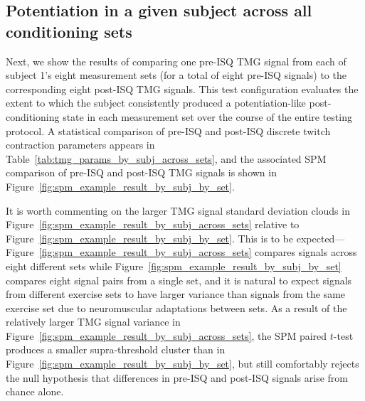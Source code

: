 \documentclass[utf8]{FrontiersinHarvard}
\begin{document}
\subsection{Potentiation in a given subject across all conditioning sets}
Next, we show the results of comparing one pre-ISQ TMG signal from each of subject 1's eight measurement sets (for a total of eight pre-ISQ signals) to the corresponding eight post-ISQ TMG signals.
This test configuration evaluates the extent to which the subject consistently produced a potentiation-like post-conditioning state in each measurement set over the course of the entire testing protocol.
A statistical comparison of pre-ISQ and post-ISQ discrete twitch contraction parameters appears in Table~\ref{tab:tmg_params_by_subj_across_sets},
and the associated SPM comparison of pre-ISQ and post-ISQ TMG signals is shown in Figure~\ref{fig:spm_example_result_by_subj_by_set}.

It is worth commenting on the larger TMG signal standard deviation clouds in Figure~\ref{fig:spm_example_result_by_subj_across_sets} relative to Figure~\ref{fig:spm_example_result_by_subj_by_set}.
This is to be expected---Figure~\ref{fig:spm_example_result_by_subj_across_sets} compares signals across eight different sets while Figure~\ref{fig:spm_example_result_by_subj_by_set} compares eight signal pairs from a single set, and it is natural to expect signals from different exercise sets to have larger variance than signals from the same exercise set due to neuromuscular adaptations between sets.
As a result of the relatively larger TMG signal variance in Figure~\ref{fig:spm_example_result_by_subj_across_sets}, the SPM paired $ t $-test produces a smaller supra-threshold cluster than in Figure~\ref{fig:spm_example_result_by_subj_by_set}, but still comfortably rejects the null hypothesis that differences in pre-ISQ and post-ISQ signals arise from chance alone.

\begin{table}
    \centering
    \caption{A statistical comparison of pre-ISQ and post-ISQ TMG parameters across measurement sets using the first measurement from each of subject 1's eight measurement sets.
    Each column has the same meaning as in Table~\ref{tab:tmg_params_by_subj_by_set}.
    Note the generally larger standard deviations in parameter values relative to Table~\ref{tab:tmg_params_by_subj_by_set}, in which parameter values all come from one set (rather than eight),
    mirroring the trend in Figures~\ref{fig:spm_example_result_by_subj_by_set} and~\ref{fig:spm_example_result_by_subj_across_sets}.}
    \vspace{1ex}
    \renewcommand{\arraystretch}{1.2}
    
    \label{tab:tmg_params_by_subj_across_sets}
\end{table}
\end{document}
